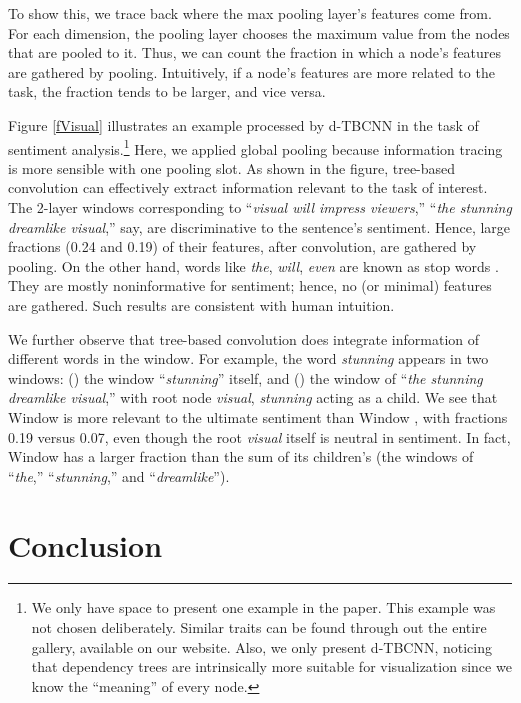 \documentclass[11pt,a4paper]{article}
\begin{document}
To show this, we trace back where the max pooling layer's features come from.
For each dimension, the pooling layer chooses the maximum value from the nodes
that are pooled to it.
Thus, we can count the fraction in which a node's features
are gathered by pooling.
Intuitively, if a node's features are more related to the task,
the fraction tends to be larger, and vice versa.

Figure \ref{fVisual} illustrates an example processed by d-TBCNN in the task
of sentiment analysis.\footnote{
We only have space to present one example in the paper.
This example was not chosen deliberately. Similar traits can be found
through out the entire gallery, available on our website.
Also, we only present d-TBCNN, noticing that dependency trees are intrinsically more suitable for visualization
since we know the ``meaning'' of every node.}
Here, we applied global pooling
because information tracing is more sensible with one pooling slot.
As shown in the figure, tree-based convolution can effectively extract
information relevant to the task of interest.
The 2-layer windows corresponding to
``\textit{visual will impress viewers},'' ``\textit{the stunning dreamlike visual},'' say,
are discriminative to the sentence's sentiment. Hence, large
fractions (0.24 and 0.19) of their
features, after convolution, are gathered by pooling.
On the other hand,
words like \textit{the}, \textit{will}, \textit{even} are known as stop words \cite{stopwords}.
They are mostly noninformative for sentiment; hence, no (or minimal)
features are gathered. Such results are
consistent with human intuition.

We further observe that tree-based convolution does integrate information
of different words in the window.
For example, the word \textit{stunning} appears in two windows:
() the window ``\textit{stunning}'' itself,
and () the window of ``\textit{the stunning dreamlike visual},'' with root node  \textit{visual},
\textit{stunning} acting as a child.
We see that Window  is more relevant to the ultimate sentiment than Window ,
with fractions 0.19 versus 0.07,
even though the root \textit{visual} itself is neutral in sentiment.
In fact, Window  has a larger fraction than the sum of its children's (the windows of ``\textit{the},'' ``\textit{stunning},'' and ``\textit{dreamlike}'').

\vspace{-.1cm}

\section{Conclusion}
\end{document}
